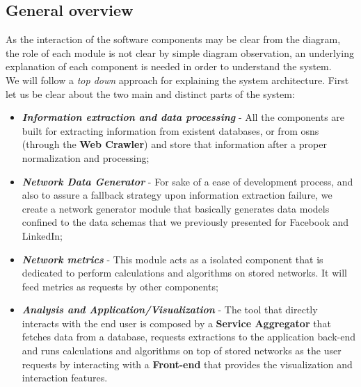 \subsection{General overview}
As the interaction of the software components may be clear from the diagram, the role of each module is not clear by simple
diagram observation, an underlying explanation of each component is needed in order to understand the system.\\
\indent We will follow a \textit{top down} approach for explaining the system architecture. First let us be clear about the two
main and distinct parts of the system:
\begin{itemize}
    \item \textbf{\textit{Information extraction and data processing}} - All the components are built for extracting information
    from existent databases, or from \glspl{osn} (through the \textbf{Web Crawler}) and store that information after a proper normalization and processing;
    \item \textbf{\textit{Network Data Generator}} - For sake of a ease of development process, and also to assure a fallback strategy upon information extraction failure, we create a network generator module that basically generates data models confined to the data schemas that we previously presented for Facebook and LinkedIn;
    \item \textbf{\textit{Network metrics}} - This module acts as a isolated component that is dedicated to perform calculations and algorithms on stored networks. It will feed metrics as requests by other components;
    \item \textbf{\textit{Analysis and Application/Visualization}} - The tool that directly interacts with the end user is composed by a \textbf{Service Aggregator} that fetches data from a database, requests extractions to the application back-end and runs calculations and algorithms on top of stored networks as the user requests by interacting with a \textbf{Front-end} that provides the visualization and interaction features.
\end{itemize}

